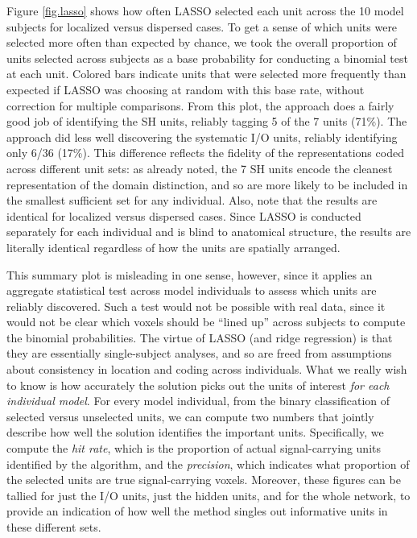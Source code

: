 Figure \ref{fig.lasso} shows how often LASSO selected each unit across the 10 model subjects for localized versus dispersed cases. To get a sense of which units were selected more often than expected by chance, we took the overall proportion of units selected across subjects as a base probability for conducting a binomial test at each unit. Colored bars indicate units that were selected more frequently than expected if LASSO was choosing at random with this base rate, without correction for multiple comparisons. From this plot, the approach does a fairly good job of identifying the SH units, reliably tagging 5 of the 7 units (71\%). The approach did less well discovering the systematic I/O units, reliably identifying only 6/36 (17\%). This difference reflects the fidelity of the representations coded across different unit sets: as already noted, the 7 SH units encode the cleanest representation of the domain distinction, and so are more likely to be included in the smallest sufficient set for any individual. Also, note that the results are identical for localized versus dispersed cases. Since LASSO is conducted separately for each individual and is blind to anatomical structure, the results are literally identical regardless of how the units are spatially arranged.

This summary plot is misleading in one sense, however, since it applies an aggregate statistical test across model individuals to assess which units are reliably discovered. Such a test would not be possible with real data, since it would not be clear which voxels should be ``lined up'' across subjects to compute the binomial probabilities. The virtue of LASSO (and ridge regression) is that they are essentially single-subject analyses, and so are freed from assumptions about consistency in location and coding across individuals. What we really wish to know is how accurately the solution picks out the units of interest {\em for each individual model}. For every model individual, from the binary classification of selected versus unselected units, we can compute two numbers that jointly describe how well the solution identifies the important units. Specifically, we compute the {\em hit rate}, which is the proportion of actual signal-carrying units identified by the algorithm, and the {\em precision}, which indicates what proportion of the selected units are true signal-carrying voxels. Moreover, these figures can be tallied for just the I/O units, just the hidden units, and for the whole network, to provide an indication of how well the method singles out informative units in these different sets. 

